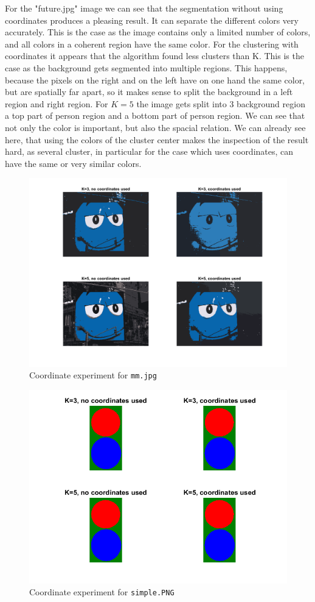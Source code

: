 For the "future.jpg" image we can see that the segmentation without using coordinates produces a pleasing result. It can separate the different colors very accurately. This is the case as the image contains only a limited number of colors, and all colors in a coherent region have the same color. For the clustering with coordinates it appears that the algorithm found less clusters than K. This is the case as the background gets segmented into multiple regions. This happens, because the pixels on the right and on the left have on one hand the same color, but are spatially far apart, so it makes sense to split the background in a left region and right region. For $K=5$ the image gets split into 3 background region a top part of person region and a bottom part of person region. We can see that not only the color is important, but also the spacial relation. We can already see here, that using the colors of the cluster center makes the inspection of the result hard, as several cluster, in particular for the case which uses coordinates, can have the same or very similar colors.
\begin{figure}
\includegraphics[width = 0.9\linewidth]{figures/task2/mm_coordinates.png}
\caption{Coordinate experiment for \texttt{mm.jpg}}
\label{fig:mm:coords}
\end{figure}


\begin{figure}[h]
\includegraphics[width = 0.9\linewidth]{figures/task2/simple_coordinates.png}
\caption{Coordinate experiment for \texttt{simple.PNG}}
\label{fig:simple:coords}
\end{figure}

